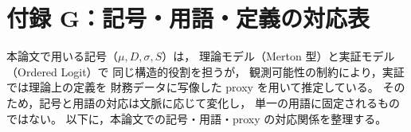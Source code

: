 %

\chapter*{付録 G：記号・用語・定義の対応表}

本論文で用いる記号（$\mu, D, \sigma, S$）は，
理論モデル（Merton 型）と実証モデル（Ordered Logit）で
同じ構造的役割を担うが，
観測可能性の制約により，実証では理論上の定義を
財務データに写像した proxy を用いて推定している。
そのため，記号と用語の対応は文脈に応じて変化し，
単一の用語に固定されるものではない。
以下に，本論文での記号・用語・proxy の対応関係を整理する。

